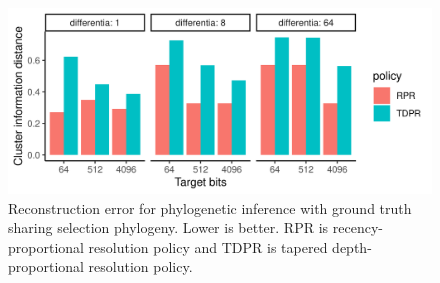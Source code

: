 \begin{figure}
    \includegraphics[width=\columnwidth]{img/cid_plot}
    \caption{
    Reconstruction error for phylogenetic inference with ground truth sharing selection phylogeny.
    Lower is better.
    RPR is recency-proportional resolution policy and TDPR is tapered depth-proportional resolution policy.
    }
  \label{fig:cid_plot}
\end{figure}
